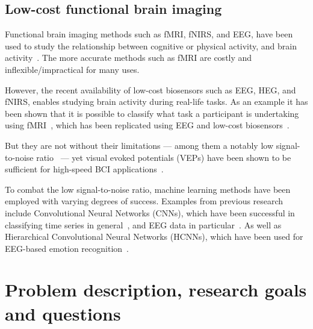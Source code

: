\documentclass{IEEEtran}
\begin{document}
\begin{refsection}

\subsection{Low-cost functional brain imaging}

Functional brain imaging methods such as fMRI, fNIRS, and EEG, have been used to study the relationship between cognitive or physical activity, and brain activity~\cite{floyd_decoding_2017}\cite{hong_classification_2015}\cite{fucci_replication_2019}. The more accurate methods such as fMRI are costly and inflexible/impractical for many uses.

However, the recent availability of low-cost biosensors such as EEG, HEG, and fNIRS, enables studying brain activity during real-life tasks. As an example it has been shown that it is possible to classify what task a participant is undertaking using fMRI~\cite{floyd_decoding_2017}, which has been replicated using EEG and low-cost biosensors~\cite{fucci_replication_2019}.

But they are not without their limitations --- among them a notably low signal-to-noise ratio~\cite{mcfarland_eeg-based_2017} --- yet visual evoked potentials (VEPs) have been shown to be sufficient for high-speed BCI applications~\cite{spuler_high-speed_2017}.

To combat the low signal-to-noise ratio, machine learning methods have been employed with varying degrees of success. Examples from previous research include Convolutional Neural Networks (CNNs), which have been successful in classifying time series in general~\cite{zhao_convolutional_2017}, and EEG data in particular~\cite{schirrmeister_deep_2017}. As well as Hierarchical Convolutional Neural Networks (HCNNs), which have been used for EEG-based emotion recognition~\cite{li_hierarchical_2018}.



\section{Problem description, research goals and questions}



\end{refsection}
\end{document}

